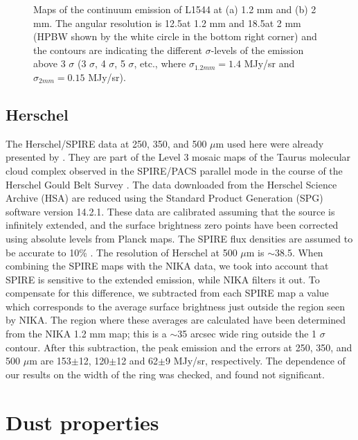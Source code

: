 \documentclass{aa}
\begin{document}
\begin{figure} 
\caption{Maps of the continuum emission of L1544 at (a) 1.2 mm and (b) 2 mm. The angular resolution is 12.5\arcsec at 1.2 mm and 18.5\arcsec at 2 mm (HPBW shown by the white circle in the bottom right corner) and the contours are indicating the different $\sigma$-levels of the emission above 3 $\sigma$ (3 $\sigma$, 4 $\sigma$, 5 $\sigma$,  etc., where $\sigma_{1.2mm} = 1.4$ MJy/sr and $\sigma_{2mm} = 0.15$ MJy/sr). }
\label{Fluxes}
\end{figure}

\subsection{Herschel}

The Herschel/SPIRE data at 250, 350, and 500 $\mu$m used here were already presented by .  They are part of the Level 3 mosaic maps of the Taurus molecular cloud complex observed in the SPIRE/PACS parallel mode in the course of the Herschel Gould Belt Survey . The data downloaded from the Herschel Science Archive (HSA) are reduced using the Standard Product Generation (SPG) software version 14.2.1. These data are calibrated assuming that the source is infinitely extended, and the surface brightness zero points have been corrected using absolute levels from Planck maps. The SPIRE flux densities are assumed to be accurate to 10\% .  The resolution of Herschel at 500 $\mu$m is $\sim$38.5\arcsec. When combining the SPIRE maps with the NIKA data, we took into account that SPIRE is sensitive to the extended emission, while NIKA filters it out. To compensate for this difference, we subtracted from each SPIRE map a value which corresponds to the average surface brightness just outside the region seen by NIKA.  The region where these averages are calculated have been determined from the NIKA 1.2 mm map; this is a $\sim$35 arcsec wide ring outside the 1 $\sigma$ contour. After this subtraction, the peak emission and the errors at 250, 350, and 500 $\mu$m are 153$\pm$12, 120$\pm$12 and 62$\pm$9 MJy/sr, respectively. The dependence of our results on the width of the ring was checked, and found not significant.


\section{Dust properties} \label{dust-properties}
\end{document}
